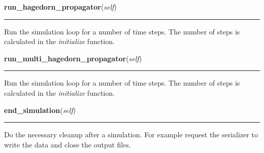     \label{SimulationLoop:SimulationLoop:run_hagedorn_propagator}

    \vspace{0.5ex}

\hspace{.8\funcindent}\begin{boxedminipage}{\funcwidth}

    \raggedright \textbf{run\_hagedorn\_propagator}(\textit{self})

    \vspace{-1.5ex}

    \rule{\textwidth}{0.5\fboxrule}
\setlength{\parskip}{2ex}
    Run the simulation loop for a number of time steps. The number of steps
    is calculated in the \textit{initialize} function.

\setlength{\parskip}{1ex}
    \end{boxedminipage}

    \label{SimulationLoop:SimulationLoop:run_multi_hagedorn_propagator}

    \vspace{0.5ex}

\hspace{.8\funcindent}\begin{boxedminipage}{\funcwidth}

    \raggedright \textbf{run\_multi\_hagedorn\_propagator}(\textit{self})

    \vspace{-1.5ex}

    \rule{\textwidth}{0.5\fboxrule}
\setlength{\parskip}{2ex}
    Run the simulation loop for a number of time steps. The number of steps
    is calculated in the \textit{initialize} function.

\setlength{\parskip}{1ex}
    \end{boxedminipage}

    \label{SimulationLoop:SimulationLoop:end_simulation}

    \vspace{0.5ex}

\hspace{.8\funcindent}\begin{boxedminipage}{\funcwidth}

    \raggedright \textbf{end\_simulation}(\textit{self})

    \vspace{-1.5ex}

    \rule{\textwidth}{0.5\fboxrule}
\setlength{\parskip}{2ex}
    Do the necessary cleanup after a simulation. For example request the
    serializer to write the data and close the output files.

\setlength{\parskip}{1ex}
    \end{boxedminipage}


